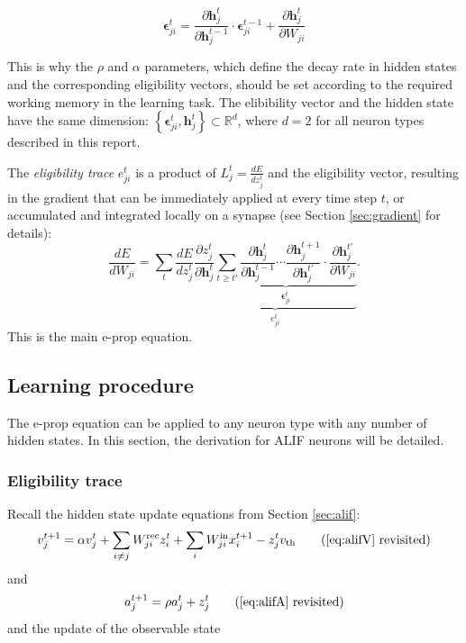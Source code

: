         \begin{equation}
        \mathbf{\epsilon}^t_{ji} = \frac{\partial\mathbf{h}_j^{t}}{\partial\mathbf{h}_j^{t-1}}\cdot\mathbf{\epsilon}^{t-1}_{ji} + \frac{\partial\mathbf{h}^t_j}{\partial W_{ji}}
        \end{equation}

        This is why the $\rho$ and $\alpha$ parameters, which define the decay rate in hidden states and the corresponding eligibility vectors, should be set according to the required working memory in the learning task.
        The elibibility vector and the hidden state have the same dimension: $\left\{\mathbf{\epsilon}^t_{ji}, \mathbf{h}^t_j\right\} \subset \mathbb{R}^d$, where $d=2$ for all neuron types described in this report.

        The \emph{eligibility trace} $e^t_{ji}$ is a product of $L^t_j = \frac{dE}{dz_j^t}$ and the eligibility vector, resulting in the gradient that can be immediately applied at every time step $t$, or accumulated and integrated locally on a synapse (see Section \ref{sec:gradient} for details):
        \begin{equation}
        \frac{dE}{dW_{ji}} = \sum_t\frac{dE}{dz_j^t}\underbrace{\frac{\partial z_j^t}{\partial\mathbf{h}_j^t}\underbrace{\sum_{t\geq t'}\frac{\partial\mathbf{h}^t_j}{\partial\mathbf{h}_j^{t-1}} \cdots \frac{\partial\mathbf{h}_j^{t+1}}{\partial\mathbf{h}_j^{t'}}\cdot\frac{\partial\mathbf{h}_j^{t'}}{\partial W_{ji}}}_{\mathbf{\epsilon}_{ji}^t}}_{e^t_{ji}}.
        \end{equation}
        This is the main e-prop equation.

    \subsection{Learning procedure}

        The e-prop equation can be applied to any neuron type with any number of hidden states.
        In this section, the derivation for ALIF neurons will be detailed.



        \subsubsection{Eligibility trace}
            Recall the hidden state update equations from Section \ref{sec:alif}:
            \begin{equation*}
            v^{t+1}_j = \alpha v_j^t + \sum_{i\neq j}W^\text{rec}_{ji}z_i^t + \sum_i W^\text{in}_{ji}x_i^{t+1} - z_j^tv_
            \text{th} \tag{\ref{eq:alifV} revisited}
            \end{equation*}
            and
            \begin{equation*}
            a^{t+1}_j = \rho a^t_j + z^t_j \tag{\ref{eq:alifA} revisited}
            \end{equation*}
            and the update of the observable state

